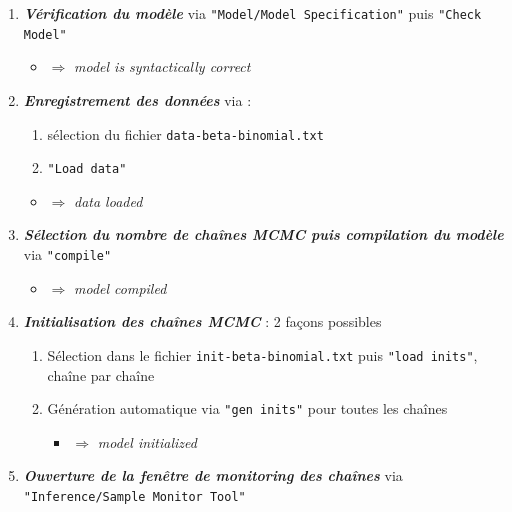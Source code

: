 \begin{enumerate}
    \item \emph{\bf Vérification du modèle} via \texttt{"Model/Model Specification"} puis \texttt{"Check Model"} 
    \begin{itemize}
        \item $\Rightarrow$ \emph{model is syntactically correct}
    \end{itemize}
    \item \emph{\bf  Enregistrement des données} via :
\begin{enumerate}
\item sélection du fichier \texttt{data-beta-binomial.txt}
\begin{center} 
 \end{center} 
 \item \texttt{"Load data"}
\end{enumerate}
\begin{itemize}
        \item $\Rightarrow$ \emph{data loaded}
    \end{itemize}
\item \emph{\bf Sélection du nombre de chaînes MCMC puis compilation du modèle} via \texttt{"compile"}
\begin{itemize}
        \item $\Rightarrow$ \emph{model compiled}
    \end{itemize}
    \item \emph{\bf Initialisation des chaînes MCMC} : 2 fa\c cons possibles
\begin{enumerate}
\item Sélection dans le fichier \texttt{init-beta-binomial.txt} puis \texttt{"load inits"}, chaîne par chaîne
\item Génération automatique via \texttt{"gen inits"} pour toutes les chaînes 
\begin{itemize}
        \item $\Rightarrow$ \emph{model initialized}
    \end{itemize}
\end{enumerate}
\item \emph{\bf Ouverture de la fenêtre de monitoring des chaînes} via \texttt{"Inference/Sample Monitor Tool"}

\end{enumerate}
